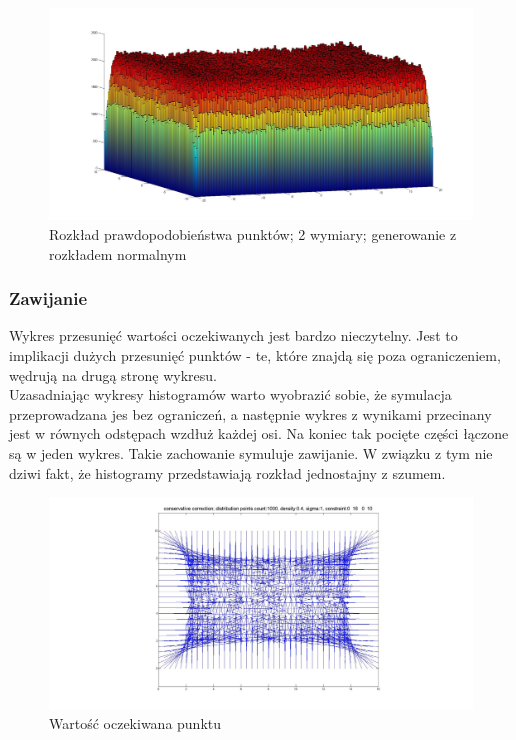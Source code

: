 \documentclass{mini}
\begin{document}
\begin{figure}[H]
\centering
\includegraphics[width=\textwidth]{s_n_10M_2__20_20__10_10_4_2}
\caption{Rozkład prawdopodobieństwa punktów; 2 wymiary; generowanie z rozkładem normalnym}
\end{figure}

\subsubsection*{Zawijanie}
Wykres przesunięć wartości oczekiwanych jest bardzo nieczytelny. Jest to implikacji dużych przesunięć punktów - te, które znajdą się poza ograniczeniem, wędrują na drugą stronę wykresu.\\
Uzasadniając wykresy histogramów warto wyobrazić sobie, że symulacja przeprowadzana jes bez ograniczeń, a następnie wykres z wynikami przecinany jest w równych odstępach wzdłuż każdej osi. Na koniec tak pocięte części łączone są w jeden wykres. Takie zachowanie symuluje zawijanie. W związku z tym nie dziwi fakt, że histogramy przedstawiają rozkład jednostajny z szumem.

\begin{figure}[H]
\centering
\includegraphics[width=\textwidth]{wrapping2dprzesuniecie}
\caption{Wartość oczekiwana punktu}
\end{figure}
\end{document}
